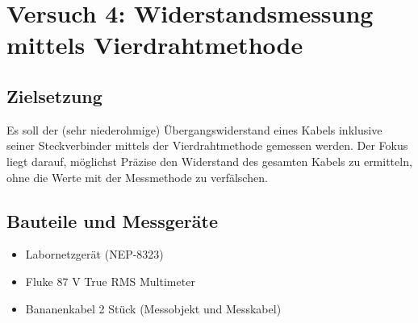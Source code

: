 \documentclass[a4paper,12pt]{article}
\begin{document}
\newpage
\section{Versuch 4: Widerstandsmessung mittels Vierdrahtmethode}
\subsection{Zielsetzung}
Es soll der (sehr niederohmige) Übergangswiderstand eines Kabels inklusive seiner Steckverbinder
mittels der Vierdrahtmethode gemessen werden. Der Fokus liegt darauf, möglichst Präzise den Widerstand des gesamten Kabels zu ermitteln, ohne die Werte mit der Messmethode zu verfälschen.

\subsection{Bauteile und Messgeräte}
\begin{itemize}
\item Labornetzgerät (NEP-8323)
\item Fluke 87 V True RMS Multimeter
\item Bananenkabel 2 Stück (Messobjekt und Messkabel)
\end{itemize}
\end{document}
